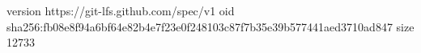 version https://git-lfs.github.com/spec/v1
oid sha256:fb08e8f94a6bf64e82b4e7f23e0f248103c87f7b35e39b577441aed3710ad847
size 12733
